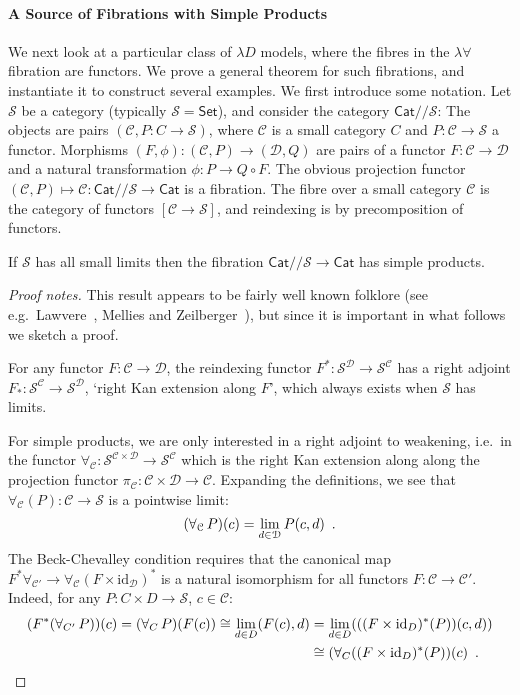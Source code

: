 \documentclass[a4paper,UKenglish]{lipics}
\newcommand{\msf}[1]{\mathsf{#1}} %
\newcommand{\Set}{\msf{Set}}
\newcommand{\Cat}{\msf{Cat}}
\newcommand{\C}{\mathcal{C}}
\newcommand{\D}{\mathcal{D}}
\newcommand{\lslice}{/\!/}
\newcommand{\id}{\mathrm{id}}
\begin{document}
\paragraph*{A Source of Fibrations with Simple Products}

We next look at a particular class of $\lambda D$ models, where the
fibres in the $\lambda \forall$ fibration are functors. We prove a
general theorem for such fibrations, and instantiate it to construct
several examples.
%
We first introduce some notation.  Let $\mathcal S$ be a category
(typically $\mathcal S=\Set$), and consider the category
$\Cat\lslice\mathcal S$: The objects are pairs $(\C,P:C\to \mathcal
S)$, where $\C$ is a small category $C$ and $P:\C\to \mathcal S$ a
functor.  Morphisms $(F,\phi):(\C,P)\to (\D,Q)$ are pairs of a
functor $F:\C\to \D$ and a natural transformation $\phi : P \to Q \circ F$.  The
obvious projection functor $(\C,P)\mapsto \C : \Cat\lslice \mathcal S\to \Cat$ is a fibration. The fibre over a small category $\C$
is the category of functors $[\C\to\mathcal S]$, and reindexing is by
precomposition of functors.

\begin{theorem}
\label{thm:BC}
If $\mathcal S$ has all small limits
then the fibration $\Cat\lslice \mathcal S\to \Cat$ has simple products.
\end{theorem}
\begin{proof}[Proof notes]
This result appears to be fairly well known folklore
(see e.g.\ Lawvere~\cite[end of \S 3]{lawvere-adjointness}, Mellies and Zeilberger~\cite{mellies-zeilberger}),
but since it is important in what follows we sketch a proof.

For any functor $F:\C\to \D$,
the reindexing functor $F^*:\mathcal S^\D\to \mathcal S^\C$
has a right adjoint
$F_*:\mathcal S^\C\to\mathcal S^\D$, `right Kan extension along $F$',
which always exists when $\mathcal S$ has limits.

For simple products, we are only interested in a right adjoint to weakening,
i.e.\ in the functor $\forall_\C:\mathcal S^{\C\times \D}\to \mathcal S^\C$
which is the right Kan extension along
along the projection functor $\pi_\C:\C\times \D\to \C$.
Expanding the definitions, we see that $\forall_\C(P):\C\to\mathcal S$ is
a pointwise limit:
\begin{equation}
(\forall_\C\,P)(c)=\lim_{d\in \D}P(c,d)\enspace\text.
\label{eqn:forall-limit}
\end{equation}
The Beck-Chevalley condition requires that the canonical map
$
F^*\forall_{\C'}
\to
\forall_{\C}(F\times \id_\D)^*
$
is a natural isomorphism for all functors $F:\C\to \C'$. Indeed, for any $P:C\times D\to \mathcal S$, $c\in \mathcal C$:
\begin{align*}
(F^*(\forall_{C'}\,P))(c)
 =
(\forall_C\,P)(F(c))
\cong
\lim_{d\in D}(F(c),d)
 & =
\lim_{d\in D}(((F\times \id_D)^*(P))(c,d)) \\
 & \cong
(\forall_{C}((F\times \id_D)^*(P))(c)
\enspace \text. \qedhere
\end{align*}
\end{proof}
\end{document}

